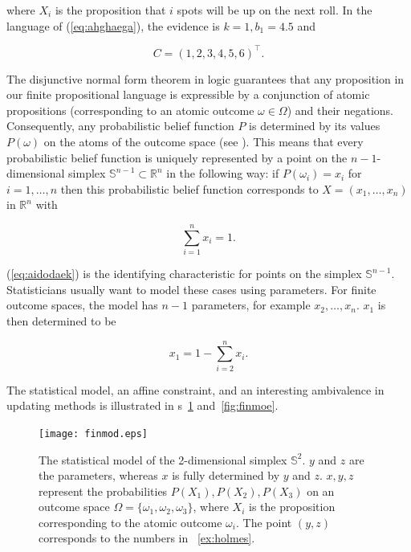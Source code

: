 \documentclass[phd,12pt,oneside]{ubcthesis}
\begin{document}
{\noindent}where $X_{i}$ is the proposition that $i$ spots will be up on the next
roll. In the language of (\ref{eq:ahghaega}), the evidence is
$k=1,b_{1}=4.5$ and

\begin{equation}
  \label{eq:thaethae}
  C=(1,2,3,4,5,6)^{\intercal}.
\end{equation}

The disjunctive normal form theorem in logic guarantees that any
proposition in our finite propositional language is expressible by a
conjunction of atomic propositions (corresponding to an atomic outcome
$\omega\in\Omega$) and their negations. Consequently, any
probabilistic belief function $P$ is determined by its values
$P(\omega)$ on the atoms of the outcome space (see
). This means that every probabilistic belief
function is uniquely represented by a point on the $n-1$-dimensional
simplex $\mathbb{S}^{n-1}\subset\mathbb{R}^{n}$ in the following way:
if $P(\omega_{i})=x_{i}$ for $i=1,\ldots,n$ then this probabilistic
belief function corresponds to $X=(x_{1},\ldots,x_{n})$ in
$\mathbb{R}^{n}$ with 

\begin{equation}
  \label{eq:aidodaek}
  \sum_{i=1}^{n}x_{i}=1.
\end{equation}

{\noindent}(\ref{eq:aidodaek}) is the identifying characteristic for points on
the simplex $\mathbb{S}^{n-1}$. Statisticians usually want to model
these cases using parameters. For finite outcome spaces, the model has
$n-1$ parameters, for example $x_{2},\ldots,x_{n}$. $x_{1}$ is then
determined to be

\begin{equation}
  \label{eq:poojaesu}
  x_{1}=1-\sum_{i=2}^{n}x_{i}.
\end{equation}

{\noindent}The statistical model, an affine constraint, and an
interesting ambivalence in updating methods is illustrated in
{\igure}s~\ref{fig:finmod} and~\ref{fig:finmoe}.

\begin{figure}[ht!]
    \begin{minipage}[h]{.7\linewidth}
      \texttt{[image: finmod.eps]}
      \caption{\footnotesize The statistical model of the
        2-dimensional simplex $\mathbb{S}^{2}$. $y$ and $z$ are the
        parameters, whereas $x$ is fully determined by $y$ and $z$.
        $x,y,z$ represent the probabilities
        $P(X_{1}),P(X_{2}),P(X_{3})$ on an outcome space
        $\Omega=\{\omega_{1},\omega_{2},\omega_{3}\}$, where $X_{i}$
        is the proposition corresponding to the atomic outcome
        $\omega_{i}$. The point $(y,z)$ corresponds to the numbers in
        {\xample}~\ref{ex:holmes}.}
      \label{fig:finmod}
    \end{minipage}
\end{figure}
\end{document}
